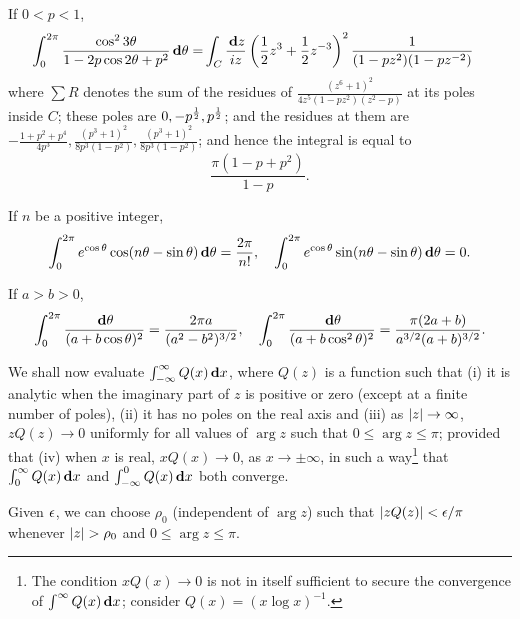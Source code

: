 \begin{wandwexample}
  If $0 < p < 1$,
  \begin{align*}
    \int_{0}^{2\pi} \frac{ \cos^{2} 3\theta}{1-2p\cos 2\theta + p^{2}}
    \, \mathbf{d} \theta
    =&
    \int_{C} \frac{\, \mathbf{d} z}{iz}
    \left(  \frac{1}{2} z^{3} + \frac{1}{2} z^{-3} \right)^{2}
    \frac{1}{ (1-pz^{2})(1-pz^{-2})}
  \end{align*}
  where $\sum R$ denotes the sum of the residues of
  $ \frac{ (z^{6} + 1)^{2} }{ 4z^{5} (1-pz^{2})(z^{2}-p)} $ at its poles
  inside $C$; these poles are $0, -p^{\frac{1}{2}}, p^{\frac{1}{2}}$;
  and the residues at them are
  $ -\frac{1+p^{2}+p^{4}}{4p^{3}},
  \frac{(p^{3}+1)^{2}}{ 8p^{3}(1-p^{2})},
  \frac{(p^{3}+1)^{2}}{ 8p^{3}(1-p^{2})}$; %
  and hence the integral is equal to
  $$
  \frac{\pi (1-p+p^{2})}{1-p}.
  $$
\end{wandwexample}
\begin{wandwexample}
  If $n$ be a positive integer,
  $$
  \int_{0}^{2\pi} e^{\cos\theta} \cos(n\theta - \sin\theta)
  \, \mathbf{d} \theta
  =
  \frac{2\pi}{n!},
  \quad
  \int_{0}^{2\pi}
  e^{\cos\theta} \sin(n\theta - \sin\theta) \, \mathbf{d} \theta
  =
  0.
  $$
\end{wandwexample}
\begin{wandwexample}
  If $a>b>0$,
  $$
  \int_{0}^{2\pi}
  \frac{\, \mathbf{d} \theta}{ (a+b\cos\theta)^{2}}
  =
  \frac{2\pi a}{ (a^{2}-b^{2})^{3/2} },
  \quad
  \int_{0}^{2\pi}
  \frac{\, \mathbf{d}\theta}{ (a+b\cos^{2}\theta)^{2}}
  =
  \frac{\pi(2a+b)}{ a^{3/2} (a+b)^{3/2}}.
  $$
\end{wandwexample}
We shall now evaluate $\int_{-\infty}^{\infty} Q(x) \, \mathbf{d} x$,
where $Q(z)$ is a function such that (i) it is analytic when the
imaginary part of $z$ is positive or zero (except at a finite number
of poles), (ii) it has no poles on the real axis and (iii) as
$\left| z \right|\rightarrow\infty$, $zQ(z) \rightarrow 0$ uniformly for all
values of $\arg z$ such that $0 \leq \arg z \leq \pi$; provided that
(iv) when $x$ is real, $x Q(x) \rightarrow 0$, as
$x \rightarrow \pm\infty$, in such a way\footnote{The condition
  $x Q(x)\rightarrow 0$ is not in itself sufficient to secure the
  convergence of
  $\int^{\infty} Q(x) \, \mathbf{d} x$;
  consider $Q(x) = (x \log x)^{-1}$.}
that $\int_{0}^{\infty} Q(x) \, \mathbf{d} x$ and
$\int_{-\infty}^{0} Q(x) \, \mathbf{d} x$ both converge.

Given $\epsilon$, we can choose $\rho_{0}$ (independent of $\arg z$) such
that $\left| z Q(z) \right| < \epsilon/\pi$ whenever
$\left| z \right| > \rho_{0}$ and $0 \leq \arg z \leq \pi$.


